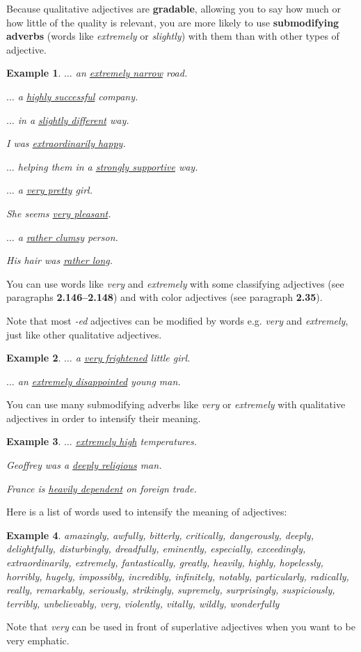 \documentclass[oneside]{book}
\numberwithin{equation}{section}
\newtheorem{example}{Example}[section]
\begin{document}
%
\noindent{} Because qualitative adjectives are \textbf{gradable}, allowing you to say how much or how little of the quality is relevant, you are more likely to use \textbf{submodifying adverbs} (words like \textit{extremely} or \textit{slightly}) with them than with other types of adjective.
\begin{example}
    $\ldots$ an \underline{extremely narrow} road.
    
    $\ldots$ a \underline{highly successful} company.
    
    $\ldots$ in a \underline{slightly different} way.
    
    I was \underline{extraordinarily happy}.
    
    $\ldots$ helping them in a \underline{strongly supportive} way.
    
    $\ldots$ a \underline{very pretty} girl.
    
    She seems \underline{very pleasant}.
    
    $\ldots$ a \underline{rather clumsy} person.
    
    His hair was \underline{rather long}.
\end{example}
%
\noindent{} You can use words like \textit{very} and \textit{extremely} with some classifying adjectives (see paragraphs \textbf{2.146--2.148}) and with color adjectives (see paragraph \textbf{2.35}).

Note that most \textit{-ed} adjectives can be modified by words e.g. \textit{very} and \textit{extremely}, just like other qualitative adjectives.
\begin{example}
    $\ldots$ a \underline{very frightened} little girl.
    
    $\ldots$ an \underline{extremely disappointed} young man.
\end{example}
%
\noindent{} You can use many submodifying adverbs like \textit{very} or \textit{extremely} with qualitative adjectives in order to intensify their meaning.
\begin{example}
    $\ldots$ \underline{extremely high} temperatures.
    
    Geoffrey was a \underline{deeply religious} man.
    
    France is \underline{heavily dependent} on foreign trade.
\end{example}
Here is a list of words used to intensify the meaning of adjectives:
\begin{example}
    amazingly, awfully, bitterly, critically, dangerously, deeply, delightfully, disturbingly, dreadfully, eminently, especially, exceedingly, extraordinarily, extremely, fantastically, greatly, heavily, highly, hopelessly, horribly, hugely, impossibly, incredibly, infinitely, notably, particularly, radically, really, remarkably, seriously, strikingly, supremely, surprisingly, suspiciously, terribly, unbelievably, very, violently, vitally, wildly, wonderfully
\end{example}
Note that \textit{very} can be used in front of superlative adjectives when you want to be very emphatic.
\end{document}
